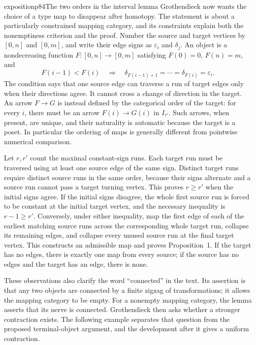 \begin{dcomment}{exposition}{p84}{The two orders in the interval lemma}
Grothendieck now wants the choice of a type map to disappear after homotopy. The statement is about a particularly constrained mapping category, and its constraints explain both the nonemptiness criterion and the proof. Number the source and target vertices by $[0,n]$ and $[0,m]$, and write their edge signs as $\varepsilon_i$ and $\delta_j$. An object is a nondecreasing function $F:[0,n]\to[0,m]$ satisfying $F(0)=0$, $F(n)=m$, and
\[
 F(i-1)<F(i)\quad\Longrightarrow\quad
 \delta_{F(i-1)+1}=\cdots=\delta_{F(i)}=\varepsilon_i.
\]
The condition says that one source edge can traverse a run of target edges only when their directions agree. It cannot cross a change of direction in the target. An arrow $F\to G$ is instead defined by the categorical order of the target: for every $i$, there must be an arrow $F(i)\to G(i)$ in $I_{\tau'}$. Such arrows, when present, are unique, and their naturality is automatic because the target is a poset. In particular the ordering of maps is generally different from pointwise numerical comparison.

Let $r,r'$ count the maximal constant-sign runs. Each target run must be traversed using at least one source edge of the same sign. Distinct target runs require distinct source runs in the same order, because their signs alternate and a source run cannot pass a target turning vertex. This proves $r\geq r'$ when the initial signs agree. If the initial signs disagree, the whole first source run is forced to be constant at the initial target vertex, and the necessary inequality is $r-1\geq r'$. Conversely, under either inequality, map the first edge of each of the earliest matching source runs across the corresponding whole target run, collapse its remaining edges, and collapse every unused source run at the final target vertex. This constructs an admissible map and proves Proposition~1. If the target has no edges, there is exactly one map from every source; if the source has no edges and the target has an edge, there is none.

These observations also clarify the word ``connected'' in the text. Its assertion is that any two objects are connected by a finite zigzag of transformations; it allows the mapping category to be empty. For a nonempty mapping category, the lemma asserts that its nerve is connected. Grothendieck then asks whether a stronger contraction exists. The following example separates that question from the proposed terminal-object argument, and the development after it gives a uniform contraction.
\end{dcomment}

